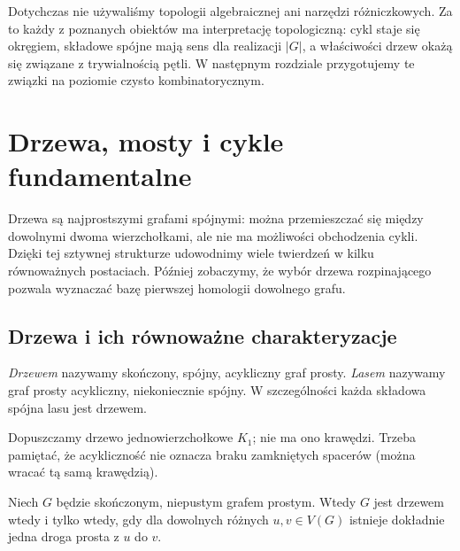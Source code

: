 \begin{uwaga}
Dotychczas nie używaliśmy topologii algebraicznej ani
narzędzi różniczkowych. Za to każdy z poznanych obiektów
ma interpretację topologiczną: cykl staje się okręgiem,
składowe spójne mają sens dla realizacji $|G|$, a
właściwości drzew okażą się związane z trywialnością
pętli. W następnym rozdziale przygotujemy te związki
na poziomie czysto kombinatorycznym.
\end{uwaga}

\chapter{Drzewa, mosty i cykle fundamentalne}
\label{ch:tg-drzewa}

Drzewa są najprostszymi grafami spójnymi: można przemieszczać się
między dowolnymi dwoma wierzchołkami, ale nie ma możliwości
obchodzenia cykli. Dzięki tej sztywnej strukturze udowodnimy
wiele twierdzeń w kilku równoważnych postaciach. Później
zobaczymy, że wybór drzewa rozpinającego pozwala wyznaczać
bazę pierwszej homologii dowolnego grafu.

\section{Drzewa i ich równoważne charakteryzacje}
\label{sec:tg-def-drzewo}

\begin{definicja}
\emph{Drzewem} nazywamy skończony, spójny, acykliczny
graf prosty. \emph{Lasem} nazywamy graf prosty
acykliczny, niekoniecznie spójny. W szczególności
każda składowa spójna lasu jest drzewem.
\end{definicja}

Dopuszczamy drzewo jednowierzchołkowe $K_1$; nie ma
ono krawędzi. Trzeba pamiętać, że acykliczność
nie oznacza braku zamkniętych spacerów (można
wracać tą samą krawędzią).

\begin{twierdzenie}
Niech $G$ będzie skończonym, niepustym grafem prostym.
Wtedy $G$ jest drzewem wtedy i tylko wtedy, gdy
dla dowolnych różnych $u,v\in V(G)$ istnieje
dokładnie jedna droga prosta z $u$ do $v$.
\end{twierdzenie}

